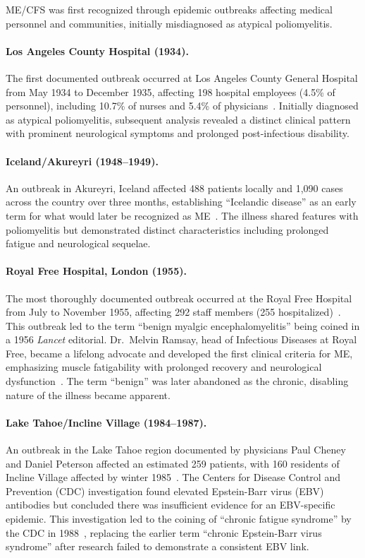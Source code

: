 ME/CFS was first recognized through epidemic outbreaks affecting medical personnel and communities, initially misdiagnosed as atypical poliomyelitis.

\paragraph{Los Angeles County Hospital (1934).}
The first documented outbreak occurred at Los Angeles County General Hospital from May 1934 to December 1935, affecting 198 hospital employees (4.5\% of personnel), including 10.7\% of nurses and 5.4\% of physicians~\cite{Gilliam1938}. Initially diagnosed as atypical poliomyelitis, subsequent analysis revealed a distinct clinical pattern with prominent neurological symptoms and prolonged post-infectious disability.

\paragraph{Iceland/Akureyri (1948--1949).}
An outbreak in Akureyri, Iceland affected 488 patients locally and 1,090 cases across the country over three months, establishing ``Icelandic disease'' as an early term for what would later be recognized as ME~\cite{Sigurdsson1950}. The illness shared features with poliomyelitis but demonstrated distinct characteristics including prolonged fatigue and neurological sequelae.

\paragraph{Royal Free Hospital, London (1955).}
The most thoroughly documented outbreak occurred at the Royal Free Hospital from July to November 1955, affecting 292 staff members (255 hospitalized)~\cite{RoyalFree1957}. This outbreak led to the term ``benign myalgic encephalomyelitis'' being coined in a 1956 \emph{Lancet} editorial. Dr.~Melvin Ramsay, head of Infectious Diseases at Royal Free, became a lifelong advocate and developed the first clinical criteria for ME, emphasizing muscle fatigability with prolonged recovery and neurological dysfunction~\cite{Ramsay1986}. The term ``benign'' was later abandoned as the chronic, disabling nature of the illness became apparent.

\paragraph{Lake Tahoe/Incline Village (1984--1987).}
An outbreak in the Lake Tahoe region documented by physicians Paul Cheney and Daniel Peterson affected an estimated 259 patients, with 160 residents of Incline Village affected by winter 1985~\cite{Buchwald1992}. The Centers for Disease Control and Prevention (CDC) investigation found elevated Epstein-Barr virus (EBV) antibodies but concluded there was insufficient evidence for an EBV-specific epidemic. This investigation led to the coining of ``chronic fatigue syndrome'' by the CDC in 1988~\cite{Holmes1988}, replacing the earlier term ``chronic Epstein-Barr virus syndrome'' after research failed to demonstrate a consistent EBV link.

